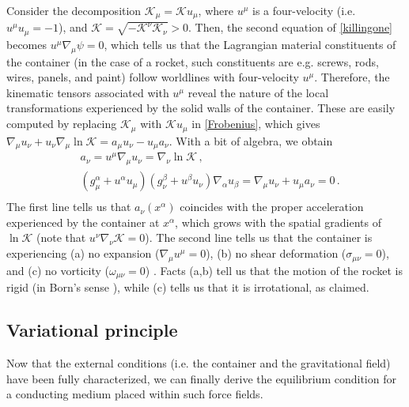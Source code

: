 \documentclass[a4paper, amsfonts, amssymb, amsmath, reprint, showkeys, nofootinbib, twoside, onecolumn,notitlepage]{revtex4-1}
\newcommand{\K}{{\mathcal{K}}}
\theoremstyle{definition}
\theoremstyle{theorem}
\begin{document}
Consider the decomposition $\K_\mu =\K u_\mu$, where $u^\mu$ is a four-velocity (i.e. $u^\mu u_\mu=-1$), and $\K=\sqrt{-\K^\nu \K_\nu}>0$. Then, the second equation of \eqref{killingone} becomes $u^\mu \nabla_\mu \psi=0$, which tells us that the Lagrangian material constituents of the container (in the case of a rocket, such constituents are e.g. screws, rods, wires, panels, and paint) follow worldlines with four-velocity $u^\mu$. Therefore, the kinematic tensors associated with $u^\mu$ reveal the nature of the local transformations experienced by the solid walls of the container. These are easily computed by replacing $\K_\mu$ with $\K u_\mu$ in \eqref{Frobenius}, which gives $\nabla_\mu u_\nu +u_\nu \nabla_\mu \ln \K =a_\mu u_\nu -u_\mu a_\nu$. With a bit of algebra, we obtain
\begin{equation}\label{accelerazione}
\begin{split}
& a_\nu =u^\mu \nabla_\mu u_\nu=\nabla_\nu \ln \K \, , \\
& (g^\alpha_\mu {+}u^\alpha u_\mu)(g^\beta_\nu {+}u^\beta u_\nu)\nabla_\alpha u_\beta = \nabla_\mu u_\nu +u_\mu a_\nu=0 \, . \\
\end{split}
\end{equation}
The first line tells us that $a_\nu(x^\alpha)$ coincides with the proper acceleration experienced by the container at $x^\alpha$, which grows with the spatial gradients of $\ln \K$ (note that $u^\nu \nabla_\nu \K{=}0$). The second line tells us that the container is experiencing (a) no expansion ($\nabla_\mu u^\mu {=}0$), (b) no shear deformation ($\sigma_{\mu \nu}{=}0$), and (c) no vorticity ($\omega_{\mu \nu}{=}0$) \cite[\S 3.1]{rezzolla_book}. Facts (a,b) tell us that the motion of the rocket is rigid (in Born's sense \cite{Born1909}), while (c) tells us that it is irrotational, as claimed.

\subsection{Variational principle}

Now that the external conditions (i.e. the container and the gravitational field) have been fully characterized, we can finally derive the equilibrium condition for a conducting medium placed within such force fields.
\end{document}
